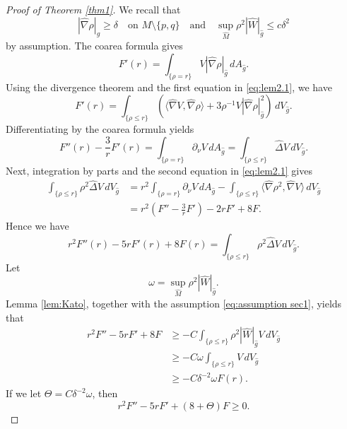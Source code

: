 \documentclass[11pt]{amsart}
\theoremstyle{plain}
\numberwithin{equation}{section}
\newcommand{\hd}{\widehat{\Delta}}
\newcommand{\hn}{\widehat{\nabla}}
\newcommand{\hg}{\widehat{g}}
\newcommand{\hw}{\widehat{W}}
\newcommand{\hm}{\widehat{M}}
\newcommand{\dv}{\,dV_{\widehat{g}}}
\newcommand{\da}{\,dA_{\widehat{g}}}
\newcommand{\sls}{\{\rho\le r\}}
\newcommand{\ls}{\{\rho=r\}}
\begin{document}
\begin{proof}[Proof of Theorem \ref{thm1}] We recall that
\begin{equation*}
|\hn\rho|_{\hg}\ge\delta\quad\text{on $M\setminus\{p,q\}$}\quad \text{and}\quad \sup_{\hm}\rho^2|\hw|_{\hg}\le c\delta^2
\end{equation*} by assumption. The coarea formula gives 
\begin{equation*}
F'(r)=\int_{\ls}V|\hn\rho|_{\hg}\da.
\end{equation*}
Using the divergence theorem and the first equation in \eqref{eq:lem2.1}, we have
\begin{equation*}
F'(r)=\int_{\sls}\left(\langle\hn V,\hn\rho\rangle+3\rho^{-1}V|\hn\rho|^2_{\hg}\right)\dv.
\end{equation*}
Differentiating by the coarea formula yields 
\begin{equation*}
F''(r)-\frac{3}{r}F'(r)=\int_{\ls}\partial_\nu V\da=\int_{\sls}\hd V\dv.
\end{equation*}
Next, integration by parts and the second equation in \eqref{eq:lem2.1} gives
\begin{align*}
\int_{\sls}\rho^2\hd V\dv&=r^2\int_{\ls}\partial_\nu V\da-\int_{\sls}\langle\hn\rho^2, \hn V\rangle\dv\\
&=r^2\left(F''-\frac{3}{r}F'\right)-2rF'+8F.
\end{align*}
Hence we have
\begin{equation*}
r^2F''(r)-5rF'(r)+8F(r)=\int_{\sls}\rho^2\hd V\dv.
\end{equation*}
Let 
\begin{equation*}
\omega=\sup_{\hm}\rho^2|\hw|_{\hg}.
\end{equation*}
Lemma \ref{lem:Kato}, together with the assumption \eqref{eq:assumption sec1}, yields that 
\begin{align*}
r^2F''-5rF'+8F&\ge-C\int_{\sls}\rho^2|\hw|_{\hg}V\dv\\&\ge -C\omega\int_{\sls}V\dv\\
&\ge-C\delta^{-2}\omega F(r).
\end{align*}
If we let $\Theta=C\delta^{-2}\omega$, then
\begin{equation}\label{eq:ODE}
r^2F''-5rF'+(8+\Theta)F\ge0.
\end{equation}


\end{proof}
\end{document}
